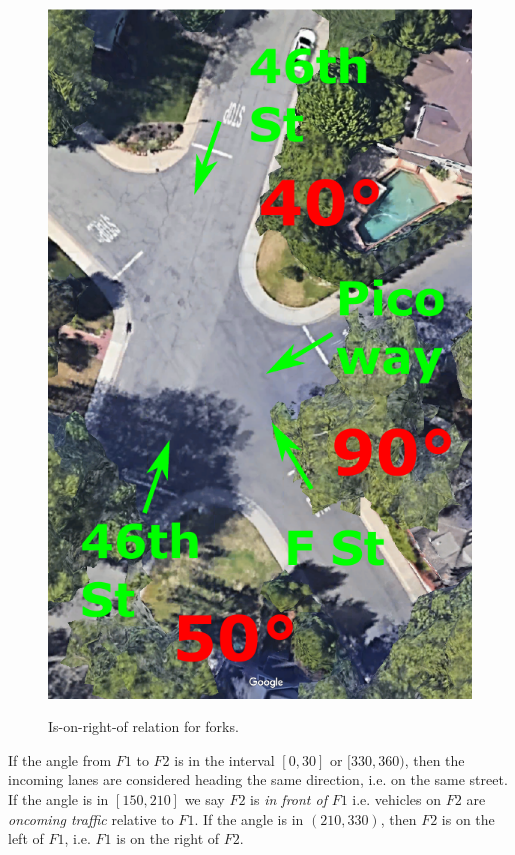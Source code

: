 \begin{figure}
\begin{minipage}[b]{.3\linewidth}
  \end{minipage}%
  \hspace*{5mm}
  \begin{minipage}[t]{.3\linewidth}
      {\includegraphics[width=\linewidth]{figures/chapter3/onTheRightOf_F-46th.pdf}}%
  \end{minipage}%
  \caption
  {%
    Is-on-right-of relation for forks.%
    \label{fig:on-the-right-of}%
  }%
\end{figure}%

If the angle from $F1$ to $F2$ is in the interval $[0, 30]$ or $[330, 360)$,
then the incoming lanes are considered heading the same direction,
i.e. on the same street.
If the angle is in $[150, 210]$
we say $F2$ is \emph{in front of} $F1$
i.e. vehicles on $F2$ are \emph{oncoming traffic} relative to $F1$.
If the angle is in $(210, 330)$,
then $F2$ is on the left of $F1$,
i.e. $F1$ is on the right of $F2$.

